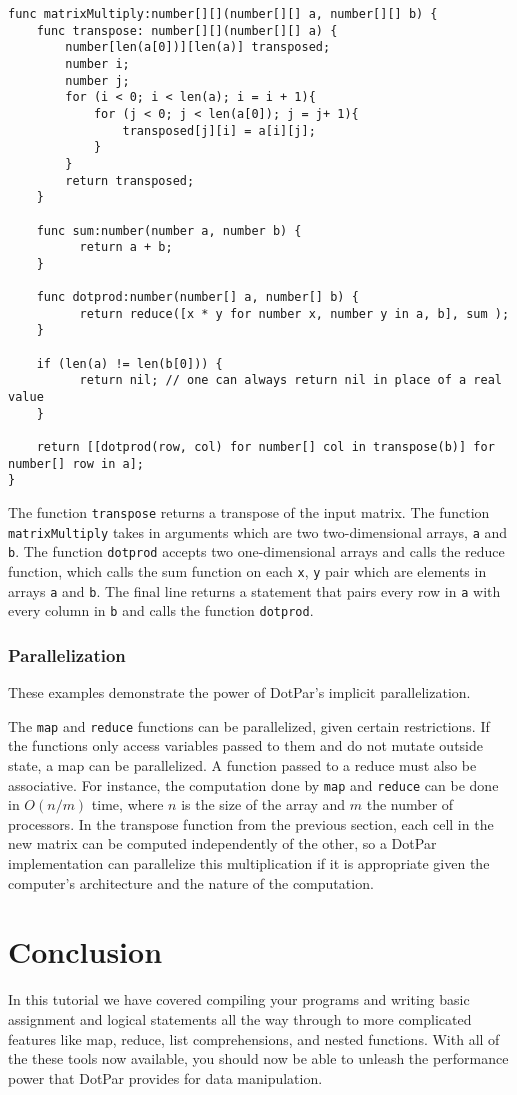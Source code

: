 \begin{verbatim}
func matrixMultiply:number[][](number[][] a, number[][] b) {
    func transpose: number[][](number[][] a) {
        number[len(a[0])][len(a)] transposed;
        number i;
        number j;
        for (i < 0; i < len(a); i = i + 1){
            for (j < 0; j < len(a[0]); j = j+ 1){
                transposed[j][i] = a[i][j];
            }
        }
        return transposed;
    }

    func sum:number(number a, number b) {
          return a + b;
    }

    func dotprod:number(number[] a, number[] b) {
          return reduce([x * y for number x, number y in a, b], sum );
    }

    if (len(a) != len(b[0])) {
          return nil; // one can always return nil in place of a real value
    }

    return [[dotprod(row, col) for number[] col in transpose(b)] for number[] row in a];
}
\end{verbatim}

The function \verb=transpose= returns a transpose of the input matrix. The
function \verb=matrixMultiply= takes in arguments which are two two-dimensional
arrays, \verb=a= and \verb=b=. The function \verb=dotprod= accepts two
one-dimensional arrays and calls the reduce function, which calls the sum
function on each \verb=x=, \verb=y= pair which are elements in arrays \verb=a=
and \verb=b=. The final line returns a statement that pairs every row in
\verb=a= with every column in \verb=b= and calls the function \verb=dotprod=.

\subsubsection{Parallelization}
These examples demonstrate the power of DotPar's implicit parallelization.

The \verb=map= and \verb=reduce= functions can be parallelized, given certain
restrictions. If the functions only access variables passed to them and do not
mutate outside state, a map can be parallelized. A function passed to a reduce
must also be associative.
For instance, the computation done
by \verb=map= and \verb=reduce= can be done in $O(n/m)$ time, where $n$ is the
size of the array and $m$ the number of processors. In the transpose function
from the previous section, each cell in the new matrix can be computed
independently of the other, so a DotPar implementation can parallelize this
multiplication if it is appropriate given the computer's architecture and the
nature of the computation.

\section{Conclusion}
In this tutorial we have covered compiling your programs and writing basic
assignment and logical statements all the way through to more complicated
features like map, reduce, list comprehensions, and nested functions. With all
of the these tools now available, you should now be able to unleash the
performance power that DotPar provides for data manipulation.

